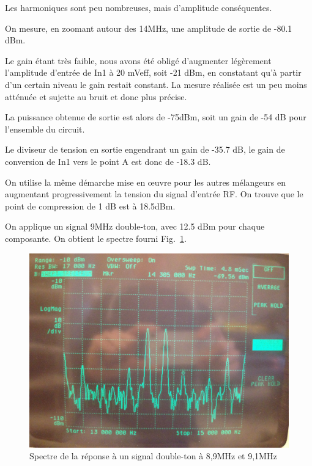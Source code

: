 \documentclass{article}
\begin{document}
Les harmoniques sont peu nombreuses, mais d'amplitude conséquentes. %


On mesure, en zoomant autour des 14MHz, une amplitude de sortie de -80.1 dBm.

Le gain étant très faible, nous avons été obligé d'augmenter légèrement l'amplitude d'entrée de In1 à 20 mVeff, soit -21 dBm, en constatant qu'à partir d'un certain niveau le gain restait constant. La mesure réalisée est un peu moins atténuée et sujette au bruit et donc plus précise.

La puissance obtenue de sortie est alors de -75dBm, soit un gain de -54 dB pour l'ensemble du circuit.

Le diviseur de tension en sortie engendrant un gain de -35.7 dB, le gain de conversion de In1 vers le point A est donc de -18.3 dB.

%
%
%
%
%


On utilise la même démarche mise en œuvre pour les autres mélangeurs en augmentant progressivement la tension du signal d'entrée RF.
On trouve que le point de compression de 1 dB est à 18.5dBm.


On applique un signal 9MHz double-ton, avec 12.5 dBm pour chaque composante. On obtient le spectre fourni Fig.~\ref{fig:11_3_4}.

\begin{figure}[h!]
	\centering
	\includegraphics[width=.7\textwidth]{11_3_4(2eme_point)}
	\caption{Spectre de la réponse à un signal double-ton à 8,9MHz et 9,1MHz}
	\label{fig:11_3_4}
\end{figure}
\end{document}
